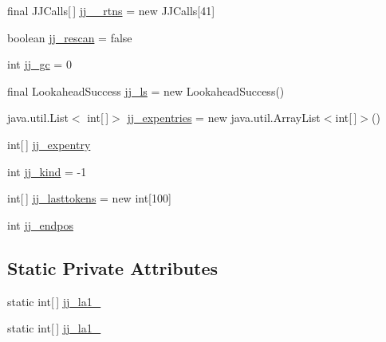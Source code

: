 \begin{DoxyCompactItemize}
\item 
final J\-J\-Calls\mbox{[}$\,$\mbox{]} \hyperlink{classuk_1_1ac_1_1manchester_1_1cs_1_1owl_1_1owlapi_1_1turtle_1_1parser_1_1_turtle_parser_aa91ec8a52db3698ec14827d62d6fc780}{jj\-\_\-\_\-rtns} = new J\-J\-Calls\mbox{[}41\mbox{]}
\item 
boolean \hyperlink{classuk_1_1ac_1_1manchester_1_1cs_1_1owl_1_1owlapi_1_1turtle_1_1parser_1_1_turtle_parser_a7d7a06a355595be808e95de57fe94e6d}{jj\-\_\-rescan} = false
\item 
int \hyperlink{classuk_1_1ac_1_1manchester_1_1cs_1_1owl_1_1owlapi_1_1turtle_1_1parser_1_1_turtle_parser_afd239185e9ef8d77047ffe396bd67231}{jj\-\_\-gc} = 0
\item 
final Lookahead\-Success \hyperlink{classuk_1_1ac_1_1manchester_1_1cs_1_1owl_1_1owlapi_1_1turtle_1_1parser_1_1_turtle_parser_a2e5acd736472ab49ac6e99ee61ce8a8c}{jj\-\_\-ls} = new Lookahead\-Success()
\item 
java.\-util.\-List$<$ int\mbox{[}$\,$\mbox{]}$>$ \hyperlink{classuk_1_1ac_1_1manchester_1_1cs_1_1owl_1_1owlapi_1_1turtle_1_1parser_1_1_turtle_parser_a02e48a9b8b26be26875ca58a9e110343}{jj\-\_\-expentries} = new java.\-util.\-Array\-List$<$int\mbox{[}$\,$\mbox{]}$>$()
\item 
int\mbox{[}$\,$\mbox{]} \hyperlink{classuk_1_1ac_1_1manchester_1_1cs_1_1owl_1_1owlapi_1_1turtle_1_1parser_1_1_turtle_parser_ad12e96261e1091f722d61f563cce0dc1}{jj\-\_\-expentry}
\item 
int \hyperlink{classuk_1_1ac_1_1manchester_1_1cs_1_1owl_1_1owlapi_1_1turtle_1_1parser_1_1_turtle_parser_a7a22a1f518c95e5309432404627f4d7e}{jj\-\_\-kind} = -\/1
\item 
int\mbox{[}$\,$\mbox{]} \hyperlink{classuk_1_1ac_1_1manchester_1_1cs_1_1owl_1_1owlapi_1_1turtle_1_1parser_1_1_turtle_parser_ab33d362924531a13069318ab1049d21e}{jj\-\_\-lasttokens} = new int\mbox{[}100\mbox{]}
\item 
int \hyperlink{classuk_1_1ac_1_1manchester_1_1cs_1_1owl_1_1owlapi_1_1turtle_1_1parser_1_1_turtle_parser_ac1f972b1261bbd8e2962ee758c5216ab}{jj\-\_\-endpos}
\end{DoxyCompactItemize}
\subsection*{Static Private Attributes}
\begin{DoxyCompactItemize}
\item 
static int\mbox{[}$\,$\mbox{]} \hyperlink{classuk_1_1ac_1_1manchester_1_1cs_1_1owl_1_1owlapi_1_1turtle_1_1parser_1_1_turtle_parser_af073379044911d87308fc51f65faac73}{jj\-\_\-la1\-\_}
\item 
static int\mbox{[}$\,$\mbox{]} \hyperlink{classuk_1_1ac_1_1manchester_1_1cs_1_1owl_1_1owlapi_1_1turtle_1_1parser_1_1_turtle_parser_a97bf7802c970d86863f59ffe9f591a83}{jj\-\_\-la1\-\_}
\end{DoxyCompactItemize}


